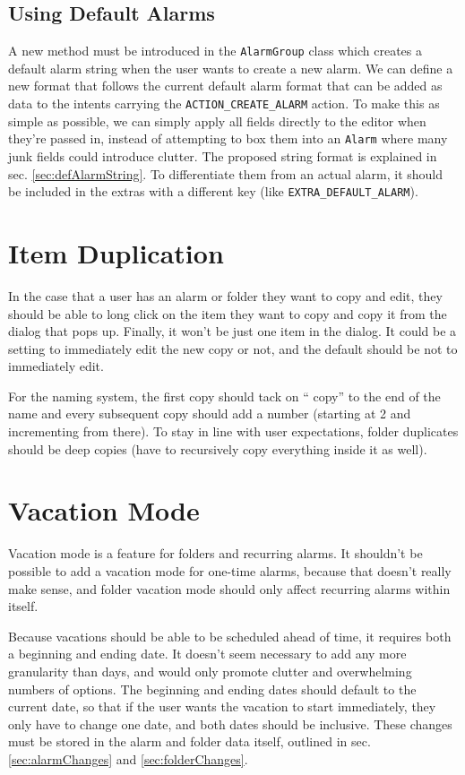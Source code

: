 \documentclass[11pt]{article} %
\begin{document}
\subsection{Using Default Alarms}
A new method must be introduced in the \verb|AlarmGroup| class which creates a default alarm string when the user wants to create a new alarm. We can define a new format that follows the current default alarm format that can be added as data to the intents carrying the \verb|ACTION_CREATE_ALARM| action. To make this as simple as possible, we can simply apply all fields directly to the editor when they're passed in, instead of attempting to box them into an \verb|Alarm| where many junk fields could introduce clutter. The proposed string format is explained in sec. \ref{sec:defAlarmString}. To differentiate them from an actual alarm, it should be included in the extras with a different key (like \verb|EXTRA_DEFAULT_ALARM|).

\section{Item Duplication}
\label{sec:itemCopying}
In the case that a user has an alarm or folder they want to copy and edit, they should be able to long click on the item they want to copy and copy it from the dialog that pops up. Finally, it won't be just one item in the dialog. It could be a setting to immediately edit the new copy or not, and the default should be not to immediately edit. 

For the naming system, the first copy should tack on `` copy'' to the end of the name and every subsequent copy should add a number (starting at 2 and incrementing from there). To stay in line with user expectations, folder duplicates should be deep copies (have to recursively copy everything inside it as well). 

\section{Vacation Mode}
\label{sec:vacationMode}
Vacation mode is a feature for folders and recurring alarms. It shouldn't be possible to add a vacation mode for one-time alarms, because that doesn't really make sense, and folder vacation mode should only affect recurring alarms within itself. 

Because vacations should be able to be scheduled ahead of time, it requires both a beginning and ending date. It doesn't seem necessary to add any more granularity than days, and would only promote clutter and overwhelming numbers of options. The beginning and ending dates should default to the current date, so that if the user wants the vacation to start immediately, they only have to change one date, and both dates should be inclusive. These changes must be stored in the alarm and folder data itself, outlined in sec. \ref{sec:alarmChanges} and \ref{sec:folderChanges}.
\end{document}
